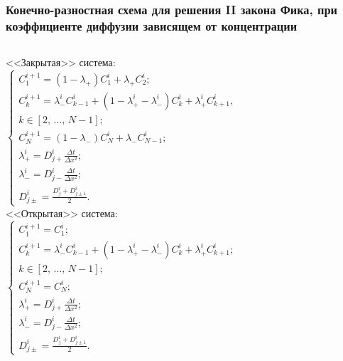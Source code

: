 \documentclass[10pt,pdf,hyperref={unicode},aspectratio={169}]{beamer}
\begin{document}
\begin{frame}
	\frametitle{Конечно-разностная схема для решения II закона Фика, при коэффициенте диффузии зависящем от концентрации}
	\begin{columns}
		<<Закрытая>> система:
		\begin{equation*}
			\begin{cases}
				C^{i+1}_{1} = (1 - \lambda_{+})C^{i}_{1} + \lambda_{+} C^{i}_{2};\\
				C^{i+1}_{k} = \lambda_{-}^{i} C^{i}_{k-1} + (1 - \lambda^{i}_{+} - \lambda^{i}_{-})C^{i}_{k} + \lambda^{i}_{+} C^{i}_{k+1},\\
				k \in [2,\,\dots,\,N-1];\\
				C^{i+1}_{N} = (1 - \lambda_{-})C^{i}_{N} + \lambda_{-} C^{i}_{N-1};\\
				\lambda^{i}_{+} = D_{j+}^{i}\frac{\Delta t}{\Delta x^{2}};\\
				\lambda^{i}_{-} = D_{j-}^{i}\frac{\Delta t}{\Delta x^{2}};\\
				D_{j\pm}^{i} = \frac{D^{i}_{j} + D^{i}_{j\pm1}}{2}.
			\end{cases}
		\end{equation*}
		<<Открытая>> система:
		\begin{equation*}
			\begin{cases}
				C^{i+1}_{1} = C^{i}_{1};\\
				C^{i+1}_{k} = \lambda_{-}^{i} C^{i}_{k-1} + (1 - \lambda^{i}_{+} - \lambda^{i}_{-})C^{i}_{k} + \lambda^{i}_{+} C^{i}_{k+1};\\
				k \in [2,\,\dots,\,N-1];\\
				C^{i+1}_{N} = C^{i}_{N};\\
				\lambda^{i}_{+} = D_{j+}^{i}\frac{\Delta t}{\Delta x^{2}};\\
				\lambda^{i}_{-} = D_{j-}^{i}\frac{\Delta t}{\Delta x^{2}};\\
				D_{j\pm}^{i} = \frac{D^{i}_{j} + D^{i}_{j\pm1}}{2}.
			\end{cases}
		\end{equation*}
	\end{columns}
\end{frame}
\end{document}
